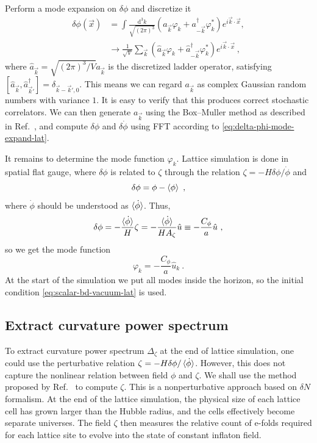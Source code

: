 \documentclass[reprint, 10pt, amsmath, amssymb, floatfix, aps, prd, superscriptaddress, nofootinbib, nobibnotes,twocolumn]{revtex4-1}
\def\dd{{\mathrm{d}}}
\begin{document}
Perform a mode expansion on $\delta\phi$ and discretize it
\begin{align}
	\delta\phi(\vec x) & = \int\frac{\dd^3k}{\sqrt{(2\pi)^3}}\left(a_{\vec k} \varphi_k + a_{-\vec k}^\dagger\varphi_k^\ast\right) e^{i\vec k\cdot\vec x},\nonumber\\
	& \to \frac{1}{\sqrt V}\sum_{\vec k}\left(\hat a_{\vec k}\varphi_k + \hat a_{-\vec k}^\dagger\varphi_k^\ast\right)e^{i\vec k\cdot\vec x}\label{eq:delta-phi-mode-expand-lat} \ ,
\end{align}
where $\hat a_{\vec k} = \sqrt{(2\pi)^3 / V}a_{\vec k}$ is the discretized ladder operator, satisfying $[\hat a_{\vec k}, \hat a_{\vec k'}^\dagger] = \delta_{\vec k - \vec k', 0}$. This means we can regard $a_{\vec k}$ as complex Gaussian random numbers with variance $1$. It is easy to verify that this produces correct stochastic correlators. We can then generate $a_{\vec k}$ using the Box–Muller method as described in Ref.~\cite{Caravano:2021pgc}, and compute $\delta\phi$ and $\delta\dot\phi$ using FFT according to \eqref{eq:delta-phi-mode-expand-lat}.

It remains to determine the mode function $\varphi_k$. Lattice simulation is done in spatial flat gauge, where $\delta\phi$ is related to $\zeta$ through the relation $\zeta = -H\delta\phi / \dot\phi$ and
\begin{equation}
	\delta\phi = \phi - \braket{\phi} \ ,
\end{equation}
where $\dot\phi$ should be understood as $\braket{\dot\phi}$. Thus,
\begin{equation}
	\delta\phi = -\frac{\braket{\dot\phi}}{H}\zeta = -\frac{\braket
	{\dot\phi}}{H A_\zeta}\hat u \equiv -\frac{C_\phi}{a}\hat u  \ ,
\end{equation}
so we get the mode function
\begin{equation}
	\varphi_k = -\frac{C_\phi}{a}\hat u_k \ .
\end{equation}
At the start of the simulation we put all modes inside the horizon, so the initial condition \eqref{eq:scalar-bd-vacuum-lat} is used.

\subsection{Extract curvature power spectrum}
To extract curvature power spectrum $\Delta_\zeta$ at the end of lattice simulation, one could use the perturbative relation $\zeta = -H\delta\phi / \braket{\dot\phi}$. However, this does not capture the nonlinear relation between field $\phi$ and $\zeta$. We shall use the method proposed by Ref.~\cite{Caravano:2025diq} to compute $\zeta$. This is a nonperturbative approach based on $\delta N$ formalism. At the end of the lattice simulation, the physical size of each lattice cell has grown larger than the Hubble radius, and the cells effectively become separate universes. The field $\zeta$ then measures the relative count of e-folds required for each lattice site to evolve into the state of constant inflaton field.
\end{document}
